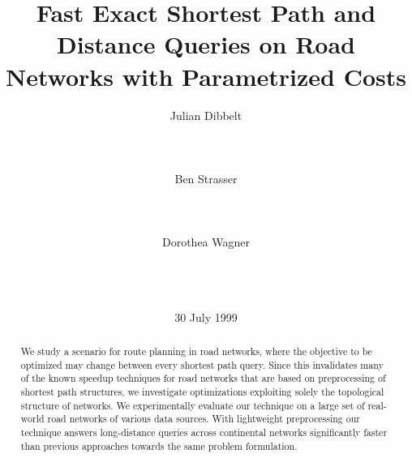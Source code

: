 \documentclass{sig-alternate}
\begin{document}
\title{Fast Exact Shortest Path and Distance Queries on Road Networks with Parametrized Costs}

\author{
\alignauthor
Julian Dibbelt\\
       \\
       \\
       \\
\alignauthor
Ben Strasser\\
       \\
       \\
       \\
\alignauthor 
Dorothea Wagner\\
       \\
       \\
       \\
}

\date{30 July 1999}

\maketitle

\begin{abstract}
We study a scenario for route planning in road networks, where the objective to be optimized may change between every shortest path query.
Since this invalidates many of the known speedup techniques for road networks that are based on preprocessing of shortest path structures, we investigate optimizations exploiting solely the topological structure of networks.
We experimentally evaluate our technique on a large set of real-world road networks of various data sources. With lightweight preprocessing our technique answers long-distance queries across continental networks significantly faster than previous approaches towards the same problem formulation.
\end{abstract}
\end{document}
